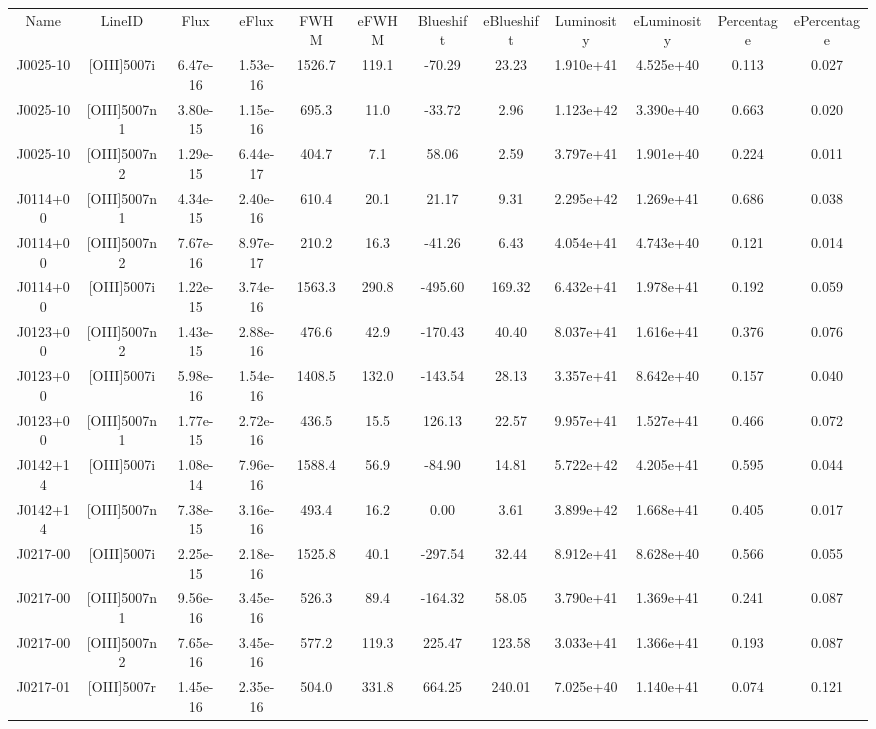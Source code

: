\begin{table}
\begin{tabular}{cccccccccccc}
Name & LineID & Flux & eFlux & FWHM & eFWHM & Blueshift & eBlueshift & Luminosity & eLuminosity & Percentage & ePercentage \\
J0025-10 & [OIII]5007i & 6.47e-16 & 1.53e-16 & 1526.7 & 119.1 & -70.29 & 23.23 & 1.910e+41 & 4.525e+40 & 0.113 & 0.027 \\
J0025-10 & [OIII]5007n1 & 3.80e-15 & 1.15e-16 & 695.3 & 11.0 & -33.72 & 2.96 & 1.123e+42 & 3.390e+40 & 0.663 & 0.020 \\
J0025-10 & [OIII]5007n2 & 1.29e-15 & 6.44e-17 & 404.7 & 7.1 & 58.06 & 2.59 & 3.797e+41 & 1.901e+40 & 0.224 & 0.011 \\
J0114+00 & [OIII]5007n1 & 4.34e-15 & 2.40e-16 & 610.4 & 20.1 & 21.17 & 9.31 & 2.295e+42 & 1.269e+41 & 0.686 & 0.038 \\
J0114+00 & [OIII]5007n2 & 7.67e-16 & 8.97e-17 & 210.2 & 16.3 & -41.26 & 6.43 & 4.054e+41 & 4.743e+40 & 0.121 & 0.014 \\
J0114+00 & [OIII]5007i & 1.22e-15 & 3.74e-16 & 1563.3 & 290.8 & -495.60 & 169.32 & 6.432e+41 & 1.978e+41 & 0.192 & 0.059 \\
J0123+00 & [OIII]5007n2 & 1.43e-15 & 2.88e-16 & 476.6 & 42.9 & -170.43 & 40.40 & 8.037e+41 & 1.616e+41 & 0.376 & 0.076 \\
J0123+00 & [OIII]5007i & 5.98e-16 & 1.54e-16 & 1408.5 & 132.0 & -143.54 & 28.13 & 3.357e+41 & 8.642e+40 & 0.157 & 0.040 \\
J0123+00 & [OIII]5007n1 & 1.77e-15 & 2.72e-16 & 436.5 & 15.5 & 126.13 & 22.57 & 9.957e+41 & 1.527e+41 & 0.466 & 0.072 \\
J0142+14 & [OIII]5007i & 1.08e-14 & 7.96e-16 & 1588.4 & 56.9 & -84.90 & 14.81 & 5.722e+42 & 4.205e+41 & 0.595 & 0.044 \\
J0142+14 & [OIII]5007n & 7.38e-15 & 3.16e-16 & 493.4 & 16.2 & 0.00 & 3.61 & 3.899e+42 & 1.668e+41 & 0.405 & 0.017 \\
J0217-00 & [OIII]5007i & 2.25e-15 & 2.18e-16 & 1525.8 & 40.1 & -297.54 & 32.44 & 8.912e+41 & 8.628e+40 & 0.566 & 0.055 \\
J0217-00 & [OIII]5007n1 & 9.56e-16 & 3.45e-16 & 526.3 & 89.4 & -164.32 & 58.05 & 3.790e+41 & 1.369e+41 & 0.241 & 0.087 \\
J0217-00 & [OIII]5007n2 & 7.65e-16 & 3.45e-16 & 577.2 & 119.3 & 225.47 & 123.58 & 3.033e+41 & 1.366e+41 & 0.193 & 0.087 \\
J0217-01 & [OIII]5007r & 1.45e-16 & 2.35e-16 & 504.0 & 331.8 & 664.25 & 240.01 & 7.025e+40 & 1.140e+41 & 0.074 & 0.121 \\

\end{tabular}
\end{table}
